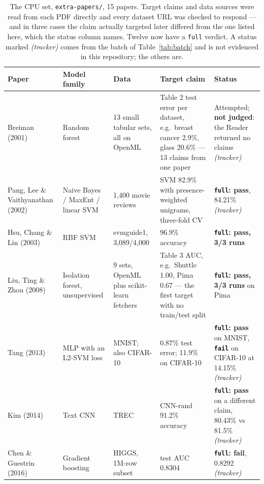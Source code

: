 \documentclass[11pt]{article}
\newcommand{\squeeze}{\setlength{\tabcolsep}{4pt}}
\begin{document}
\begin{table}[tbp]
\centering
\small
\caption{The CPU set, \texttt{extra-papers/}, 15 papers. Target claims and data sources were read
from each PDF directly and every dataset URL was checked to respond --- and in three cases the
claim actually targeted later differed from the one listed here, which the status column names.
Twelve now have a \texttt{full} verdict. A status marked \emph{(tracker)} comes from the batch of
Table~\ref{tab:batch} and is not evidenced in this repository; the others are.}
\label{tab:cpuset}
\squeeze
\begin{tabular}{L{0.165\textwidth}L{0.155\textwidth}L{0.145\textwidth}L{0.225\textwidth}L{0.165\textwidth}}
\toprule
Paper & Model family & Data & Target claim & Status \\
\midrule
Breiman (2001) \cite{breiman2001rf} & Random forest & 13 small tabular sets, all on OpenML &
  Table 2 test error per dataset, e.g.\ breast cancer 2.9\%, glass 20.6\% --- 13 claims from one
  paper & Attempted; \textbf{not judged}: the Reader returned no claims \emph{(tracker)} \\
Pang, Lee \& Vaithyanathan (2002) \cite{pang2002thumbs} & Naive Bayes / MaxEnt / linear SVM &
  1{,}400 movie reviews & SVM 82.9\% with presence-weighted unigrams, three-fold CV &
  \textbf{\texttt{full}: pass}, 84.21\% \emph{(tracker)} \\
Hsu, Chang \& Lin (2003) \cite{hsu2003guide} & RBF SVM & svmguide1, 3{,}089/4{,}000 & 96.9\%
  accuracy & \textbf{\texttt{full}: pass, 3/3 runs} \\
Liu, Ting \& Zhou (2008) \cite{liu2008iforest} & Isolation forest, unsupervised & 9 sets, OpenML
  plus scikit-learn fetchers & Table 3 AUC, e.g.\ Shuttle 1.00, Pima 0.67 --- the first target with
  no train/test split & \textbf{\texttt{full}: pass, 3/3 runs} on Pima \\
Tang (2013) \cite{tang2013dlsvm} & MLP with an L2-SVM loss & MNIST; also CIFAR-10 & 0.87\% test
  error; 11.9\% on CIFAR-10 & \textbf{\texttt{full}: pass} on MNIST, \textbf{\texttt{fail}} on
  CIFAR-10 at 14.15\% \emph{(tracker)} \\
Kim (2014) \cite{kim2014cnn} & Text CNN & TREC & CNN-rand 91.2\% accuracy &
  \textbf{\texttt{full}: pass} on a different claim, 80.43\% vs 81.5\% \emph{(tracker)} \\
Chen \& Guestrin (2016) \cite{chen2016xgboost} & Gradient boosting & HIGGS, 1M-row subset & test
  AUC 0.8304 & \textbf{\texttt{full}: fail}, 0.8292 \emph{(tracker)} \\

\end{tabular}
\end{table}
\end{document}
